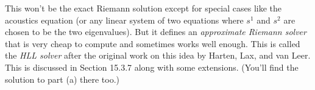 \documentclass[11pt]{article}
\begin{document}
This won't be the exact Riemann solution except for special cases like the
acoustics equation (or any linear system of two equations where $s^1$ and
$s^2$ are chosen to be the two eigenvalues).  But it defines an {\em
approximate Riemann solver} that is very cheap to compute and sometimes
works well enough.  This is called the {\em HLL solver} after the original
work on this idea by Harten, Lax, and van Leer.  This is discussed in
Section 15.3.7 along with some extensions. (You'll find the solution to part
(a) there too.)


\end{document}
